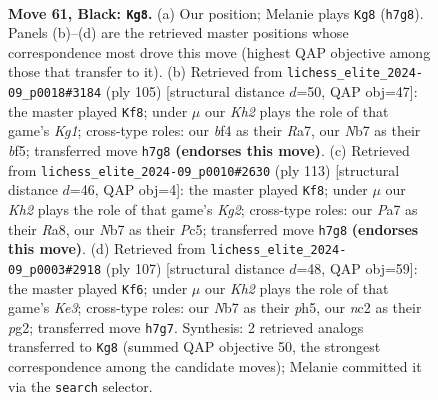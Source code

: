 \documentclass[11pt]{article}
\begin{document}
\clearpage

\begin{figure}[p]\centering
\begin{subfigure}{0.46\textwidth}\centering
\resizebox{\linewidth}{!}{%
\newchessgame
\chessboard[
  setfen={7r/pn5k/1pr1p3/7p/2PKPB2/6P1/P1N2R2/7R b - - 5 61},
  showmover=false,
  pgfstyle=straightmove, color=movearrow, markmove={h7-g8}
]}
\caption{}
\end{subfigure}\hfill
\begin{subfigure}{0.46\textwidth}\centering
\resizebox{\linewidth}{!}{%
\newchessgame
\chessboard[
  setfen={4r1k1/r4p2/1p6/2p2B2/2P2P1Q/p3P3/7P/R6K b - - 0 53},
  showmover=false,
  pgfstyle=straightmove, color=movearrow, markmove={g8-f8}
]}
\caption{}
\end{subfigure}
\\[4pt]
\begin{subfigure}{0.46\textwidth}\centering
\resizebox{\linewidth}{!}{%
\newchessgame
\chessboard[
  setfen={r7/2p3k1/8/2pP1P1p/p5pP/P5P1/1rB1RK2/8 b - - 1 57},
  showmover=false,
  pgfstyle=straightmove, color=movearrow, markmove={g7-f8}
]}
\caption{}
\end{subfigure}\hfill
\begin{subfigure}{0.46\textwidth}\centering
\resizebox{\linewidth}{!}{%
\newchessgame
\chessboard[
  setfen={8/p7/r3k2p/4p1pP/p1R5/P2r1PK1/6P1/R7 b - - 32 54},
  showmover=false,
  pgfstyle=straightmove, color=movearrow, markmove={e6-f6}
]}
\caption{}
\end{subfigure}
\caption{\textbf{Move 61, Black: \texttt{Kg8}.} (a) Our position; Melanie plays \texttt{Kg8} (\texttt{h7g8}). Panels (b)--(d) are the retrieved master positions whose correspondence most drove this move (highest QAP objective among those that transfer to it). (b) Retrieved from \texttt{lichess\_elite\_2024-09\_p0018\#3184} (ply 105) [structural distance $d$=50, QAP obj=47]: the master played \texttt{Kf8}; under $\mu$ our \emph{Kh2} plays the role of that game's \emph{Kg1}; cross-type roles: our \emph{b}f4 as their \emph{R}a7, our \emph{N}b7 as their \emph{b}f5; transferred move \texttt{h7g8} \textbf{(endorses this move)}. (c) Retrieved from \texttt{lichess\_elite\_2024-09\_p0010\#2630} (ply 113) [structural distance $d$=46, QAP obj=4]: the master played \texttt{Kf8}; under $\mu$ our \emph{Kh2} plays the role of that game's \emph{Kg2}; cross-type roles: our \emph{P}a7 as their \emph{R}a8, our \emph{N}b7 as their \emph{P}c5; transferred move \texttt{h7g8} \textbf{(endorses this move)}. (d) Retrieved from \texttt{lichess\_elite\_2024-09\_p0003\#2918} (ply 107) [structural distance $d$=48, QAP obj=59]: the master played \texttt{Kf6}; under $\mu$ our \emph{Kh2} plays the role of that game's \emph{Ke3}; cross-type roles: our \emph{N}b7 as their \emph{p}h5, our \emph{n}c2 as their \emph{p}g2; transferred move \texttt{h7g7}. Synthesis: 2 retrieved analogs transferred to \texttt{Kg8} (summed QAP objective 50, the strongest correspondence among the candidate moves); Melanie committed it via the \texttt{search} selector.}
\label{fig:thought-m121}
\end{figure}
\end{document}
